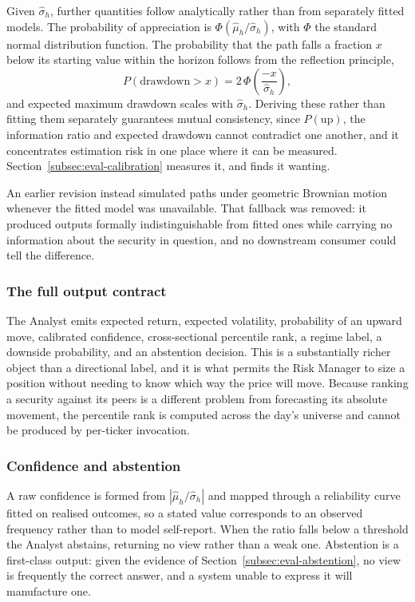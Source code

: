 \documentclass[pdflatex,sn-apa]{sn-jnl}%
\theoremstyle{thmstyleone}%
\theoremstyle{thmstyletwo}%
\theoremstyle{thmstylethree}%
\begin{document}
Given $\hat{\sigma}_h$, further quantities follow analytically rather than from
separately fitted models. The probability of appreciation is
$\Phi(\hat{\mu}_h/\hat{\sigma}_h)$, with $\Phi$ the standard normal
distribution function. The probability that the path falls a fraction $x$ below
its starting value within the horizon follows from the reflection principle,
\begin{equation}\label{eq:dd}
P(\text{drawdown} > x) = 2\,\Phi\!\left(\frac{-x}{\hat{\sigma}_h}\right),
\end{equation}
and expected maximum drawdown scales with $\hat{\sigma}_h$. Deriving these
rather than fitting them separately guarantees mutual consistency, since
$P(\text{up})$, the information ratio and expected drawdown cannot contradict
one another, and it concentrates estimation risk in one place where it can be
measured. Section~\ref{subsec:eval-calibration} measures it, and finds it
wanting.

An earlier revision instead simulated paths under geometric Brownian motion
whenever the fitted model was unavailable. That fallback was removed: it
produced outputs formally indistinguishable from fitted ones while carrying no
information about the security in question, and no downstream consumer could
tell the difference.

\subsubsection{The full output contract}\label{subsubsec:contract}

The Analyst emits expected return, expected volatility, probability of an
upward move, calibrated confidence, cross-sectional percentile rank, a regime
label, a downside probability, and an abstention decision. This is a
substantially richer object than a directional label, and it is what permits
the Risk Manager to size a position without needing to know which way the price
will move. Because ranking a security against its peers is a different problem
from forecasting its absolute movement, the percentile rank is computed across
the day's universe and cannot be produced by per-ticker invocation.

\subsubsection{Confidence and abstention}\label{subsubsec:abstention}

A raw confidence is formed from $|\hat{\mu}_h/\hat{\sigma}_h|$ and mapped
through a reliability curve fitted on realised outcomes, so a stated value
corresponds to an observed frequency rather than to model self-report. When the
ratio falls below a threshold the Analyst abstains, returning no view rather
than a weak one. Abstention is a first-class output: given the evidence of
Section~\ref{subsec:eval-abstention}, no view is frequently the correct answer,
and a system unable to express it will manufacture one.
\end{document}
